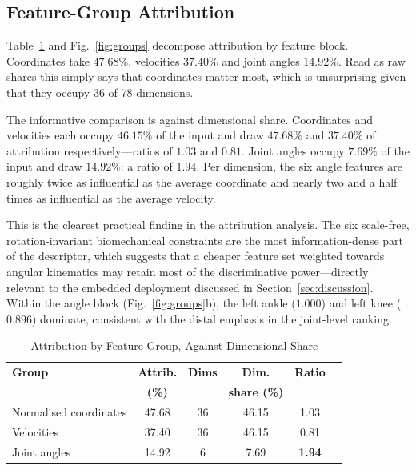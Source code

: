 \documentclass[journal]{IEEEtran}
\newcommand{\tabhead}[1]{\textbf{#1}}
\begin{document}
\subsection{Feature-Group Attribution}

Table~\ref{tab:groups} and Fig.~\ref{fig:groups} decompose attribution by
feature block. Coordinates take $47.68\%$, velocities $37.40\%$ and joint
angles $14.92\%$. Read as raw shares this simply says that coordinates matter
most, which is unsurprising given that they occupy 36 of 78 dimensions.

The informative comparison is against dimensional share. Coordinates and
velocities each occupy $46.15\%$ of the input and draw $47.68\%$ and $37.40\%$
of attribution respectively---ratios of $1.03$ and $0.81$. Joint angles occupy
$7.69\%$ of the input and draw $14.92\%$: a ratio of $1.94$. Per dimension, the
six angle features are roughly twice as influential as the average coordinate
and nearly two and a half times as influential as the average velocity.

This is the clearest practical finding in the attribution analysis. The six
scale-free, rotation-invariant biomechanical constraints are the most
information-dense part of the descriptor, which suggests that a
cheaper feature set weighted towards angular kinematics may retain most of the
discriminative power---directly relevant to the embedded deployment discussed
in Section~\ref{sec:discussion}. Within the angle block
(Fig.~\ref{fig:groups}b), the left ankle ($1.000$) and left knee ($0.896$)
dominate, consistent with the distal emphasis in the joint-level ranking.

\begin{table}[!t]
\caption{Attribution by Feature Group, Against Dimensional Share}
\label{tab:groups}
\centering
\small
\begin{tabular}{@{}lccccc@{}}
\toprule
\tabhead{Group} & \tabhead{Attrib.} & \tabhead{Dims} &
\tabhead{Dim.} & \tabhead{Ratio} \\
 & \tabhead{(\%)} & & \tabhead{share (\%)} & \\
\midrule
Normalised coordinates & 47.68 & 36 & 46.15 & 1.03 \\
Velocities             & 37.40 & 36 & 46.15 & 0.81 \\
Joint angles           & 14.92 &  6 &  7.69 & \textbf{1.94} \\
\bottomrule
\end{tabular}
\end{table}
\end{document}
